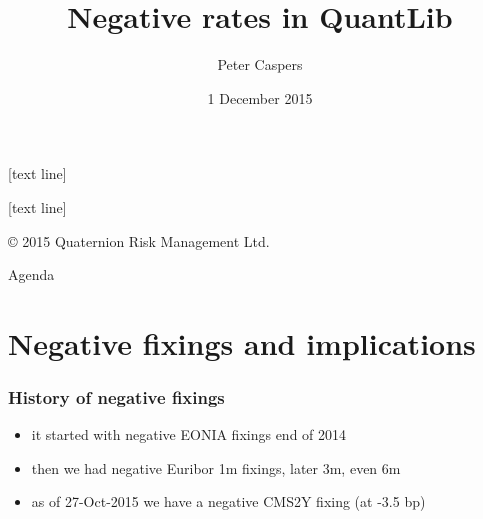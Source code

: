 \documentclass[10pt,German]{beamer}
\title{Negative rates in QuantLib}
\author[QRM]{Peter Caspers}
\institute{\normalsize Quaternion Risk Management}
\date[Short Occasion]{\small 1 December 2015}
\begin{document}
[text line]{}
\begin{frame}
\vskip 3.5cm
{\bf
\titlepage
}
\end{frame}


[text line]{
\parbox{\linewidth}
{\color{white}
\selectfont
\vspace*{-6pt}\copyright{} 2015 Quaternion Risk Management Ltd. 
\hfill\insertauthor
\hfill\insertpagenumber}
}

\begin{frame}{Agenda}
\tableofcontents
\end{frame}


\section{Negative fixings and implications}

\begin{frame}[fragile]
\frametitle{History of negative fixings}
\begin{itemize}
\item it started with negative EONIA fixings end of 2014
\item then we had negative Euribor 1m fixings, later 3m, even 6m
\item as of 27-Oct-2015 we have a negative CMS2Y fixing (at -3.5 bp)
\end{itemize}
\end{frame}
\end{document}
